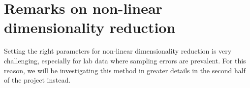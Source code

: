 \section{Remarks on non-linear dimensionality reduction}
Setting the right parameters for non-linear dimensionality reduction is very challenging, especially for lab data where sampling errors are prevalent. For this reason, we will be investigating this method in greater details in the second half of the project instead.  

